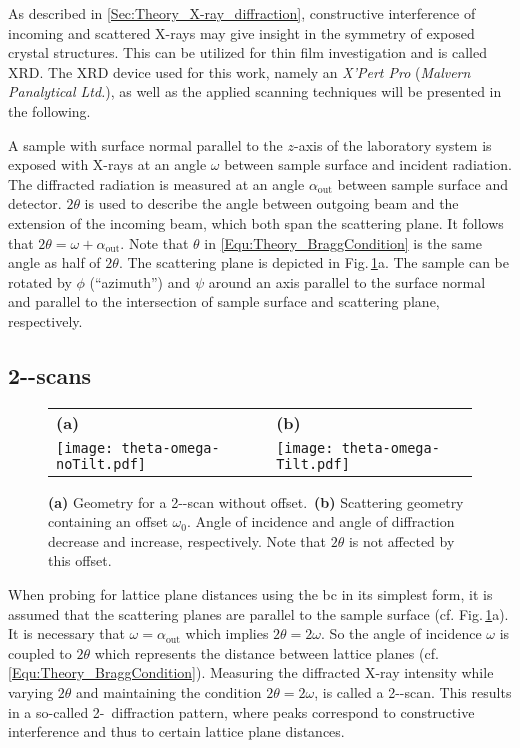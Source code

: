 \label{Sec:Methods_XRD}
As described in \ref{Sec:Theory_X-ray_diffraction}, constructive interference of incoming and scattered X-rays may give insight in the symmetry of exposed crystal structures.
This can be utilized for thin film investigation and is called \gls{XRD}.
The \gls{XRD} device used for this work, namely an \textit{X'Pert Pro} (\textit{Malvern Panalytical Ltd.}), as well as the applied scanning techniques will be presented in the following.

A sample with surface normal parallel to the $z$-axis of the laboratory system is exposed with X-rays at an angle $\omega$ between sample surface and incident radiation.
The diffracted radiation is measured at an angle $\alpha_\mathrm{out}$ between sample surface and detector.
$2\theta$ is used to describe the angle between outgoing beam and the extension of the incoming beam, which both span the scattering plane.
It follows that $2\theta=\omega+\alpha_\mathrm{out}$.
Note that $\theta$ in \eqref{Equ:Theory_BraggCondition} is the same angle as half of $2\theta$.
The scattering plane is depicted in Fig.\,\ref{Fig:Methods_XRD_geometry}a.
The sample can be rotated by $\phi$ (\enquote{azimuth}) and $\psi$ around an axis parallel to the surface normal and parallel to the intersection of sample surface and scattering plane, respectively.

\subsection{2\texttheta-\textomega-scans}
    \label{Sec:Methods_2ThetaOmega}
\begin{figure}
    \centering
    \begin{tabular}{ll}
        \textbf{(a)}&\textbf{(b)}\\
        \texttt{[image: theta-omega-noTilt.pdf]}
        &\texttt{[image: theta-omega-Tilt.pdf]}
    \end{tabular}
    \caption{\textbf{(a)} Geometry for a 2\texttheta-\textomega-scan without offset.\ \textbf{(b)} Scattering geometry containing an offset $\omega_0$. Angle of incidence and angle of diffraction decrease and increase, respectively. Note that $2\theta$ is not affected by this offset.}
    \label{Fig:Methods_XRD_geometry}
\end{figure}
When probing for lattice plane distances using the \gls{bc} in its simplest form, it is assumed that the scattering planes are parallel to the sample surface (cf. Fig.\,\ref{Fig:Methods_XRD_geometry}a).
It is necessary that $\omega=\alpha_\mathrm{out}$ which implies $2\theta=2\omega$.
So the angle of incidence $\omega$ is coupled to $2\theta$ which represents the distance between lattice planes (cf. \eqref{Equ:Theory_BraggCondition}).
Measuring the diffracted X-ray intensity while varying $2\theta$ and maintaining the condition $2\theta=2\omega$, is called a 2\texttheta-\textomega-scan.
This results in a so-called 2\texttheta-\textomega\ diffraction pattern, where peaks correspond to constructive interference and thus to certain lattice plane distances.

